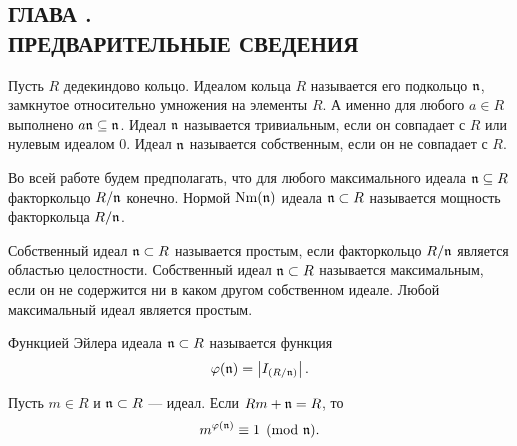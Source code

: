\documentclass[_00_dissertation.tex]{subfiles}
\begin{document}
\onlyinsubfile{
    \renewcommand{\contentsname}{ОГЛАВЛЕНИЕ}
    \setcounter{tocdepth}{3}
    \tableofcontents
}

\newpage
\begin{center}
    \section*{ГЛАВА .\\ ПРЕДВАРИТЕЛЬНЫЕ СВЕДЕНИЯ}\label{ch:Prelimiaries}
\end{center}

Пусть $R$ дедекиндово кольцо.
Идеалом кольца $R$ называется его подкольцо $\mathfrak{n}$, замкнутое относительно умножения на элементы $R$.
А именно для любого $a \in R$ выполнено $a\mathfrak{n} \subseteq \mathfrak{n}$.
Идеал $\mathfrak{n}$ называется  тривиальным, если он совпадает с $R$ или нулевым идеалом $0$.
Идеал $\mathfrak{n}$ называется собственным, если он не совпадает с $R$.

Во всей работе будем предполагать, что для любого максимального идеала $\mathfrak{n} \subseteq R$ факторкольцо $R/\mathfrak{n}$ конечно.
Нормой $\textrm{Nm}(\mathfrak{n})$ идеала $\mathfrak{n} \subset R$ называется мощность факторкольца $R/\mathfrak{n}$.

Собственный идеал $\mathfrak{n} \subset R$ называется простым, если факторкольцо $R/\mathfrak{n}$ является областью целостности.
Собственный идеал $\mathfrak{n} \subset R$ называется максимальным, если он не содержится ни в каком другом собственном идеале.
Любой максимальный идеал является простым.

\begin{definition}\cite{source:Petukhova}
    Функцией Эйлера идеала $\mathfrak{n} \subset R$ называется функция
    \begin{equation*}
        \varphi(\mathfrak{n}) = \left|
            I_{(R/\mathfrak{n})}
        \right|.
    \end{equation*}
\end{definition}

\begin{statement}\cite{source:Petukhova}
    Пусть $m \in R$ и $\mathfrak{n} \subset R$ --- идеал.
    Если $Rm + \mathfrak{n} = R$, то
    \begin{equation*}
        m^{\varphi(\mathfrak{n})}\equiv 1 \pmod{\mathfrak{n}}.
    \end{equation*}
\end{statement}
\end{document}
